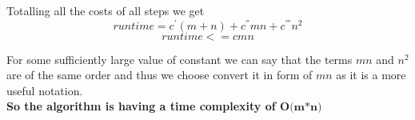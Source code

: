 \documentclass[20pt]{article}
\begin{document}
Totalling all the costs of all steps we get
\begin{equation} runtime = c^{'}(m+n) + c^{''}mn + c^{'''}n^2 \end{equation}
\begin{equation} runtime <= cmn \end{equation}

For some sufficiently large value of constant we can say that the terms $ mn $ and $ n^2 $  are of the same order and thus we choose convert it in form of $ mn $ as it is a more useful notation. \\
\textbf{So the algorithm is having a time complexity of $ \textbf{O(m*n)} $}
\end{document}
